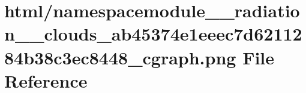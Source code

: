 \hypertarget{namespacemodule____radiation____clouds__ab45374e1eeec7d6211284b38c3ec8448__cgraph_8png}{}\section{html/namespacemodule\+\_\+\+\_\+radiation\+\_\+\+\_\+clouds\+\_\+ab45374e1eeec7d6211284b38c3ec8448\+\_\+cgraph.png File Reference}
\label{namespacemodule____radiation____clouds__ab45374e1eeec7d6211284b38c3ec8448__cgraph_8png}
